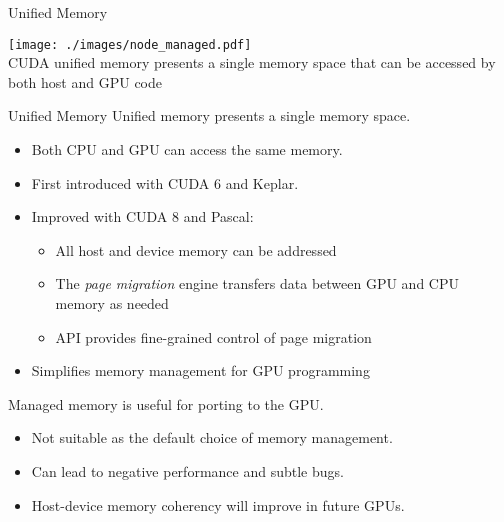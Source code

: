 \documentclass[aspectratio=43]{beamer}
\begin{document}
\begin{frame}[fragile]{Unified Memory}
    \begin{center}
        \texttt{[image: ./images/node\_managed.pdf]}
        \\
        CUDA unified memory presents a single memory space that can be accessed by both host and GPU code
    \end{center}
\end{frame}

\begin{frame}[fragile]{Unified Memory}
        Unified memory presents a single memory space.
        \begin{itemize}
            \item Both CPU and GPU can access the same memory.
            \item First introduced with CUDA 6 and Keplar.
            \item Improved with CUDA 8 and Pascal:
            \begin{itemize}
                \item All host and device memory can be addressed
                \item The \emph{page migration} engine transfers data between GPU and CPU memory as needed
                \item API provides fine-grained control of page migration
            \end{itemize}
            \item Simplifies memory management for GPU programming
        \end{itemize}
        \begin{info}{Managed memory is useful for porting to the GPU.}
            \begin{itemize}
                \item Not suitable as the default choice of memory management.
                \item Can lead to negative performance and subtle bugs.
                \item Host-device memory coherency will improve in future GPUs.
            \end{itemize}
        \end{info}
\end{frame}
\end{document}
